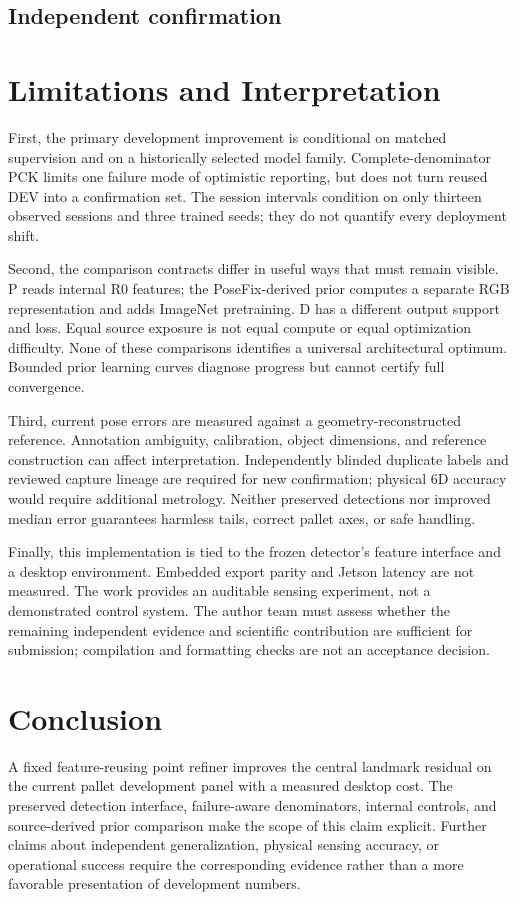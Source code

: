 \documentclass[journal]{IEEEtran}
\begin{document}
\subsection{Independent confirmation}


\section{Limitations and Interpretation}
First, the primary development improvement is conditional on matched supervision and on a historically selected model family. Complete-denominator PCK limits one failure mode of optimistic reporting, but does not turn reused DEV into a confirmation set. The session intervals condition on only thirteen observed sessions and three trained seeds; they do not quantify every deployment shift.

Second, the comparison contracts differ in useful ways that must remain visible. P reads internal R0 features; the PoseFix-derived prior computes a separate RGB representation and adds ImageNet pretraining. D has a different output support and loss. Equal source exposure is not equal compute or equal optimization difficulty. None of these comparisons identifies a universal architectural optimum. Bounded prior learning curves diagnose progress but cannot certify full convergence.

Third, current pose errors are measured against a geometry-reconstructed reference. Annotation ambiguity, calibration, object dimensions, and reference construction can affect interpretation. Independently blinded duplicate labels and reviewed capture lineage are required for new confirmation; physical 6D accuracy would require additional metrology. Neither preserved detections nor improved median error guarantees harmless tails, correct pallet axes, or safe handling.

Finally, this implementation is tied to the frozen detector's feature interface and a desktop environment. Embedded export parity and Jetson latency are not measured. The work provides an auditable sensing experiment, not a demonstrated control system. The author team must assess whether the remaining independent evidence and scientific contribution are sufficient for submission; compilation and formatting checks are not an acceptance decision.

\section{Conclusion}
A fixed feature-reusing point refiner improves the central landmark residual on the current pallet development panel with a measured desktop cost. The preserved detection interface, failure-aware denominators, internal controls, and source-derived prior comparison make the scope of this claim explicit. \ConclusionPrior{} \ConfirmationConclusion{} Further claims about independent generalization, physical sensing accuracy, or operational success require the corresponding evidence rather than a more favorable presentation of development numbers.
\end{document}
